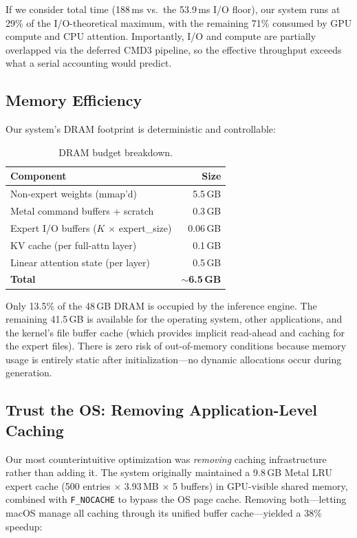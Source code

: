 \documentclass[11pt,twocolumn]{article}
\begin{document}
If we consider total time (188\,ms vs.\ the 53.9\,ms I/O floor), our system runs at 29\% of the I/O-theoretical maximum, with the remaining 71\% consumed by GPU compute and CPU attention.
Importantly, I/O and compute are partially overlapped via the deferred CMD3 pipeline, so the effective throughput exceeds what a serial accounting would predict.

\subsection{Memory Efficiency}

Our system's DRAM footprint is deterministic and controllable:

\begin{table}[t]
\centering
\small
\caption{DRAM budget breakdown.}
\label{tab:memory}
\begin{tabular}{@{}lr@{}}
\toprule
\textbf{Component} & \textbf{Size} \\
\midrule
Non-expert weights (mmap'd) & 5.5\,GB \\
Metal command buffers + scratch & 0.3\,GB \\
Expert I/O buffers ($K$ $\times$ expert\_size) & 0.06\,GB \\
KV cache (per full-attn layer) & 0.1\,GB \\
Linear attention state (per layer) & 0.5\,GB \\
\midrule
\textbf{Total} & \textbf{$\sim$6.5\,GB} \\
\bottomrule
\end{tabular}
\end{table}

Only 13.5\% of the 48\,GB DRAM is occupied by the inference engine.
The remaining 41.5\,GB is available for the operating system, other applications, and the kernel's file buffer cache (which provides implicit read-ahead and caching for the expert files).
There is zero risk of out-of-memory conditions because memory usage is entirely static after initialization---no dynamic allocations occur during generation.

\subsection{Trust the OS: Removing Application-Level Caching}
\label{sec:trust_os}

Our most counterintuitive optimization was \emph{removing} caching infrastructure rather than adding it.
The system originally maintained a 9.8\,GB Metal LRU expert cache (500 entries $\times$ 3.93\,MB $\times$ 5 buffers) in GPU-visible shared memory, combined with \texttt{F\_NOCACHE} to bypass the OS page cache.
Removing both---letting macOS manage all caching through its unified buffer cache---yielded a 38\% speedup:
\end{document}
